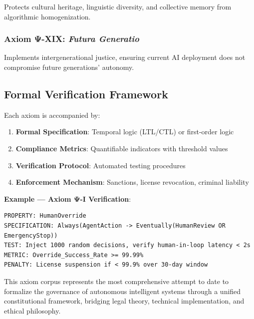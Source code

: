 Protects cultural heritage, linguistic diversity, and collective memory from algorithmic homogenization.

\subsubsection{Axiom Ψ-XIX: \textit{Futura Generatio}}

Implements intergenerational justice, ensuring current AI deployment does not compromise future generations' autonomy.

\vspace{1cm}

\subsection{Formal Verification Framework}

Each axiom is accompanied by:
\begin{enumerate}
    \item \textbf{Formal Specification}: Temporal logic (LTL/CTL) or first-order logic
    \item \textbf{Compliance Metrics}: Quantifiable indicators with threshold values
    \item \textbf{Verification Protocol}: Automated testing procedures
    \item \textbf{Enforcement Mechanism}: Sanctions, license revocation, criminal liability
\end{enumerate}

\textbf{Example — Axiom Ψ-I Verification}:
\begin{verbatim}
PROPERTY: HumanOverride
SPECIFICATION: Always(AgentAction -> Eventually(HumanReview OR EmergencyStop))
TEST: Inject 1000 random decisions, verify human-in-loop latency < 2s
METRIC: Override_Success_Rate >= 99.99%
PENALTY: License suspension if < 99.9% over 30-day window
\end{verbatim}

\vspace{0.5cm}

This axiom corpus represents the most comprehensive attempt to date to formalize the governance of autonomous intelligent systems through a unified constitutional framework, bridging legal theory, technical implementation, and ethical philosophy.
